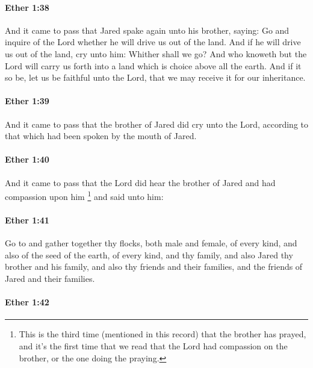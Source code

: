 		\paragraph{Ether 1:38} %
			\label{ETHER-1-38}

			And it came to pass that Jared spake again unto his brother, saying:
			Go and inquire of the Lord whether he will drive us out of the land.
			And if he will drive us out of the land, cry unto him:
			Whither shall we go?
			And who knoweth but the Lord will carry us forth into a land
			which is choice above all the earth.
			And if it so be, let us be faithful unto the Lord,
			that we may receive it for our inheritance.

		\paragraph{Ether 1:39} %
			\label{ETHER-1-39}

			And it came to pass that the brother of Jared did cry unto the Lord,
			according to that which had been spoken by the mouth of Jared.

		\paragraph{Ether 1:40} %
			\label{ETHER-1-40}

			And it came to pass that the Lord did hear the brother of Jared
			and had compassion upon him%
				\footnote{%
					This is the third time (mentioned in this record) that the brother has prayed, and it's the first time that we read that the Lord had compassion on the brother, or the one doing the praying.
					}
			and said unto him:

		\paragraph{Ether 1:41} %
			\label{ETHER-1-41}

			Go to and gather together thy flocks, both male and female, of every kind,
			and also of the seed of the earth, of every kind,
			and thy family, and also Jared thy brother and his family,
			and also thy friends and their families,
			and the friends of Jared and their families.

		\paragraph{Ether 1:42} %
			\label{ETHER-1-42}

